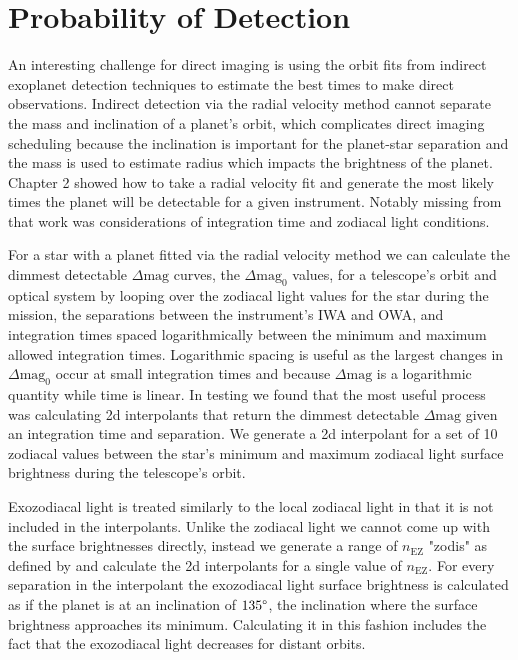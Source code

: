 
\section{Probability of Detection} %
\label{section:impact_on_pdet}

An interesting challenge for direct imaging is using the orbit fits from
indirect exoplanet detection techniques to estimate the best times to make
direct observations. Indirect detection via the radial velocity method cannot
separate the mass and inclination of a planet's orbit, which complicates direct
imaging scheduling because the inclination is important for the planet-star
separation and the mass is used to estimate radius which impacts the brightness
of the planet. Chapter 2 showed how to take a radial velocity fit and generate
the most likely times the planet will be detectable for a given instrument.
Notably missing from that work was considerations of integration time and
zodiacal light conditions.

For a star with a planet fitted via the radial velocity method we can calculate
the dimmest detectable $\Delta\textrm{mag}$ curves, the $\Delta\textrm{mag}_0$
values, for a telescope's orbit and optical system by looping over the zodiacal
light values for the star during the mission, the separations between the
instrument's IWA and OWA, and integration times spaced logarithmically between
the minimum and maximum allowed integration times. Logarithmic spacing is
useful as the largest changes in $\Delta\textrm{mag}_0$ occur at small
integration times and because $\Delta\textrm{mag}$ is a logarithmic quantity
while time is linear. In testing we found that the most useful process was
calculating 2d interpolants that return the dimmest detectable
$\Delta\textrm{mag}$ given an integration time and separation. We generate a 2d
interpolant for a set of 10 zodiacal values between the star's minimum and
maximum zodiacal light surface brightness during the telescope's orbit. 

Exozodiacal light is treated similarly to the local zodiacal light in that
it is not included in the interpolants. Unlike the zodiacal light we cannot
come up with the surface brightnesses directly, instead we generate a range of
$n_\textrm{EZ}$ "zodis" as defined by
\citet{starkMaximizingExoEarthCandidate2014} and calculate the 2d interpolants
for a single value of $n_\textrm{EZ}$. For every separation in the
interpolant the exozodiacal light surface brightness is calculated as if the
planet is at an inclination of $135\degree$, the inclination where the surface
brightness approaches its minimum. Calculating it in this fashion includes the
fact that the exozodiacal light decreases for distant orbits.

